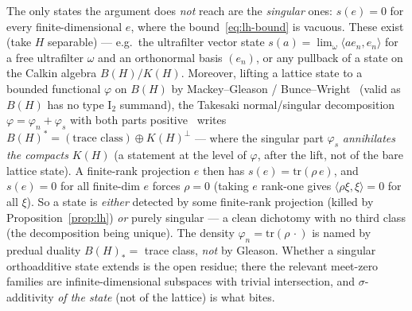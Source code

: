 \documentclass[11pt]{article}
\theoremstyle{definition}
\newcommand{\tr}{\mathrm{tr}}
\begin{document}
The only states the argument does \emph{not} reach are the
\emph{singular} ones: $s(e) = 0$ for every finite-dimensional $e$, where
the bound~\eqref{eq:lh-bound} is vacuous.  These exist (take $H$
separable) --- e.g.\ the ultrafilter vector state
$s(a) = \lim_\omega \langle a e_n, e_n\rangle$ for a free ultrafilter
$\omega$ and an orthonormal basis $(e_n)$, or any pullback of a state on
the Calkin algebra $B(H)/K(H)$.  Moreover, lifting a lattice state to a
bounded functional $\varphi$ on $B(H)$ by Mackey--Gleason /
Bunce--Wright~\cite{BunceWright1992, Christensen1982} (valid as $B(H)$
has no type $\mathrm{I}_2$ summand), the Takesaki normal/singular
decomposition $\varphi = \varphi_n + \varphi_s$ with both parts
positive~\cite{Takesaki1979} writes
$B(H)^* = (\text{trace class}) \oplus K(H)^\perp$ --- where the singular
part $\varphi_s$ \emph{annihilates the compacts} $K(H)$ (a statement at
the level of $\varphi$, after the lift, not of the bare lattice state).
A finite-rank projection $e$ then has $s(e) = \tr(\rho\, e)$, and
$s(e) = 0$ for all finite-dim $e$ forces $\rho = 0$ (taking $e$ rank-one
gives $\langle \rho \xi, \xi\rangle = 0$ for all $\xi$).  So a state is
\emph{either} detected by some finite-rank projection (killed by
Proposition~\ref{prop:lh}) \emph{or} purely singular --- a clean
dichotomy with no third class (the decomposition being unique).  The
density $\varphi_n = \tr(\rho\,\cdot)$ is named by predual duality
$B(H)_* = $ trace class, \emph{not} by Gleason.  Whether a singular orthoadditive state
extends is the open residue; there the relevant meet-zero families are
infinite-dimensional subspaces with trivial intersection, and
$\sigma$-additivity \emph{of the state} (not of the lattice) is what
bites.
\end{document}
